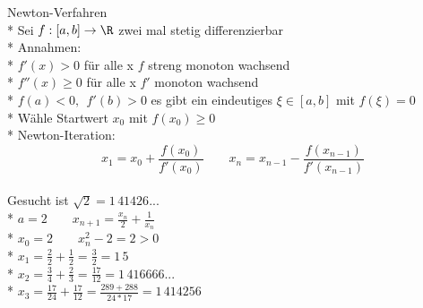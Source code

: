 Newton-Verfahren\\*
Sei $f:[a,b] \to \R$ zwei mal stetig differenzierbar\\*
Annahmen:\\*
$f'(x)>0$ für alle x \Rarr $f$ streng monoton wachsend\\*
$f''(x) \geq 0$ für alle x \Rarr $f'$ monoton wachsend\\*
$f(a) < 0,\ \ f'(b) > 0$ \Rarr es gibt ein eindeutiges $\xi \in [a,b]$ mit $f(\xi) = 0$\\*
Wähle Startwert $x_0$ mit $f(x_0) \geq 0$\\*
Newton-Iteration: 
$$x_1 = x_0 + \frac{f(x_0)}{f'(x_0)}\qquad x_n = x_{n-1} - \frac{f(x_{n-1})}{f'(x_{n-1})}$$\\

\bsp
Gesucht ist $\sqrt{2} = 1\,41426...$\\*
$a = 2 \qquad x_{n+1} = \frac{x_n}{2} + \frac{1}{x_n}$\\*
$x_0 = 2 \qquad x_n^2 - 2 = 2 > 0$\ok\\*
$x_1 = \frac{2}{2} + \frac{1}{2} = \frac{3}{2} = 1\,5$\\*
$x_2 = \frac{3}{4} + \frac{2}{3} = \frac{17}{12} = 1\,416666...$\\*
$x_3 = \frac{17}{24} + \frac{17}{12} = \frac{289 + 288}{24 * 17} = 1\,414256$